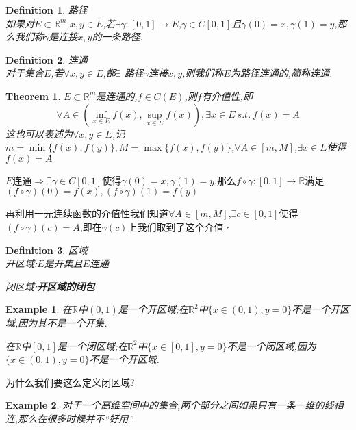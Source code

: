 \documentclass[11pt,hyperref,a4paper,UTF8]{ctexart}
\newtheorem{theorem}{Theorem}[subsection]
\newtheorem{example}{Example}[subsection]
\newtheorem{definition}{Definition}[subsection]
\newenvironment{cproof}{%
\heiti{证明}\kaishu
}{%
  \hfill $\square$
  \par\bigskip
}
\newcommand{\RR}{\mathbb{R}}
\begin{document}
\begin{CJK}{UTF8}{gkai}
\begin{definition}
  路径\\

  如果对$E \subset \RR^m$,$x,y\in E$,若$\exists \gamma : [0,1] \to E$,$\gamma \in C[0,1]$且$\gamma(0) = x,\gamma(1) = y$,那么我们称$\gamma$是连接$x,y$的一条路径.
\end{definition}

\begin{definition}
  连通\\

  对于集合$E$,若$\forall x,y \in E$,都$\exists$ 路径$\gamma$连接$x,y$,则我们称$E$为路径连通的,简称连通.
\end{definition}

\begin{theorem}
  $E \subset \RR^m$是连通的,$f \in C(E)$,则$f$有介值性,即
  \[\forall A \in (\inf_{x \in E} f(x),\sup_{x\in E} f(x)),\exists x \in E ~s.t.~ f(x) = A\]
  这也可以表述为$\forall x,y \in E$,记$m = \min\{f(x),f(y)\},M = \max\{f(x),f(y)\}$,$\forall A \in [m,M]$,$\exists x \in E$使得$f(x) = A$
\end{theorem}

\begin{cproof}
  $E$连通$\Rightarrow \exists \gamma \in C[0,1]$使得$\gamma(0) = x,\gamma(1) = y$,那么$f \circ\gamma : [0,1] \to \RR$满足$(f \circ\gamma)(0) = f(x),(f \circ\gamma)(1) = f(y)$

  再利用一元连续函数的介值性我们知道$\forall A \in [m,M]$,$\exists c \in [0,1]$使得$(f \circ\gamma)(c) = A$,即在$\gamma(c)$上我们取到了这个介值
\end{cproof}

\begin{definition}
  区域\\

  开区域:$E$是开集且$E$连通

  闭区域:\textbf{开区域的闭包}
\end{definition}

\begin{example}
  在$\RR$中$(0,1)$是一个开区域;在$\RR^2$中$\{x\in(0,1),y = 0\}$不是一个开区域,因为其不是一个开集.
  
  在$\RR$中$[0,1]$是一个闭区域;在$\RR^2$中$\{x\in[0,1],y = 0\}$不是一个闭区域,因为$\{x\in(0,1),y = 0\}$不是一个开区域.
\end{example}

为什么我们要这么定义闭区域?

\begin{example}
  对于一个高维空间中的集合,两个部分之间如果只有一条一维的线相连,那么在很多时候并不``好用''
\end{example}


\end{CJK}
\end{document}
